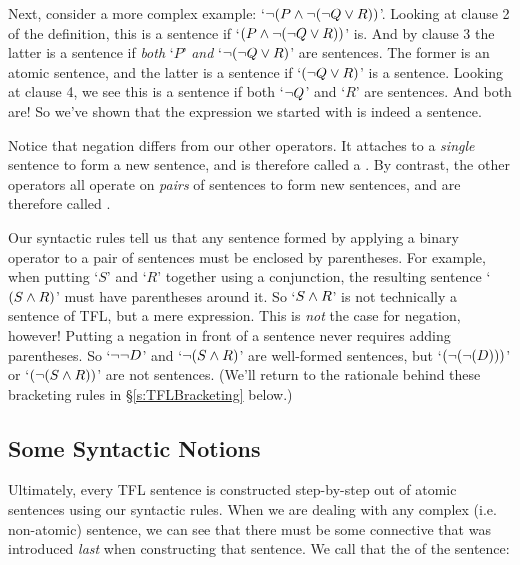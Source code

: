 Next, consider a more complex example: `$\neg (P \wedge \neg (\neg Q \vee R))$'. Looking at clause 2 of the definition, this is a sentence if `$(P \wedge \neg (\neg Q \vee R))$' is. And by clause 3 the latter is a sentence if \emph{both} `$P$' \emph{and} `$\neg (\neg Q \vee R)$' are sentences. The former is an atomic sentence, and the latter is a sentence if `$(\neg Q \vee R)$' is a sentence. Looking at clause 4, we see this is a sentence if both `$\neg Q$' and `$R$' are sentences. And both are!  So we've shown that the expression we started with is indeed a sentence.

Notice that negation differs from our other operators.  It attaches to a \emph{single} sentence to form a new sentence, and is therefore called a .  By contrast, the other operators all operate on \emph{pairs} of sentences to form new sentences, and are therefore called .

Our syntactic rules tell us that any sentence formed by applying a binary operator to a pair of sentences must be enclosed by parentheses.  For example, when putting `$S$' and `$R$' together using a conjunction, the resulting sentence `$(S \wedge R)$' must have parentheses around it.  So `$S \wedge R$' is not technically a sentence of TFL, but a mere expression.  This is \emph{not} the case for negation, however!  Putting a negation in front of a sentence never requires adding parentheses.  So `$\neg \neg D$' and `$\neg (S \wedge R)$' are well-formed sentences, but `$(\neg (\neg (D)))$' or `$(\neg (S \wedge R))$' are not sentences.  (We'll return to the rationale behind these bracketing rules in \S \ref{s:TFLBracketing} below.)

\subsection{Some Syntactic Notions}\label{s:TFLSyntacticNotions}



Ultimately, every TFL sentence is constructed step-by-step out of atomic sentences using our syntactic rules. When we are dealing with any complex (i.e. non-atomic) sentence, we can see that there must be some connective that was introduced \emph{last} when constructing that sentence. We call that the  of the sentence:


